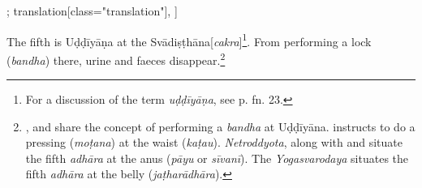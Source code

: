 \begin{alignment}[
  texts=edition[class="edition"];
  translation[class="translation"],
  ]
\begin{translation}
\begin{tlate}[p30_02]
      The fifth is Uḍḍīyāṇa at the Svādiṣṭhāna[\textit{cakra}]\footnote{For a discussion of the term \textit{uḍḍīyāṇa}, see p.\pageref{cakra2} fn. 23.}. From performing a lock (\textit{bandha}) there, urine and faeces disappear.\footnote{,  and  share the concept of performing a \textit{bandha} at Uḍḍīyāna.  instructs to do a pressing (\textit{moṭana}) at the waist (\textit{kaṭau}). \textit{Netroddyota}, along with  and  situate the fifth \textit{adhāra} at the anus (\textit{pāyu} or \textit{sīvanī}). The \textit{Yogasvarodaya} situates the fifth \textit{adhāra} at the belly (\textit{jaṭharādhāra}).}     
\flushpage
    \end{tlate}
  \end{translation}
\end{alignment}
\pagebreak %
